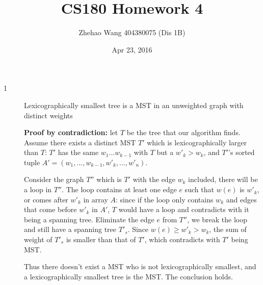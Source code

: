 \documentclass{article}
\title{CS180 Homework 4}
\author{Zhehao Wang 404380075 (Dis 1B)}
\date{Apr 23, 2016}
\begin{document}
\maketitle

\begin{description}

\item[1]{Lexicographically smallest tree is a MST in an unweighted graph with distinct weights}
  


  \textbf{Proof by contradiction:} let $T$ be the tree that our algorithm finds. Assume there exists a distinct MST $T'$ which is lexicographically larger than $T$: $T'$ has the same $w_1...w_{k-1}$ with $T$ but a $w'_k > w_k$, and $T'$'s sorted tuple $A' = (w_1,...,w_{k-1}, w'_k, ..., w'_n)$. 

  Consider the graph $T''$ which is $T'$ with the edge $w_k$ included, there will be a loop in $T''$. The loop contains at least one edge $e$ such that $w(e)$ is $w'_k$, or comes after $w'_k$ in array $A$: since if the loop only contains $w_k$ and edges that come before $w'_k$ in $A'$, $T$ would have a loop and contradicts with it being a spanning tree. Eliminate the edge $e$ from $T''$, we break the loop and still have a spanning tree $T'_s$. Since $w(e) \geq w'_k > w_k$, the sum of weight of $T'_s$ is smaller than that of $T'$, which contradicts with $T'$ being MST.

  Thus there doesn't exist a MST who is not lexicographically smallest, and a lexicographically smallest tree is the MST. The conclusion holds.


\end{description}
\end{document}
